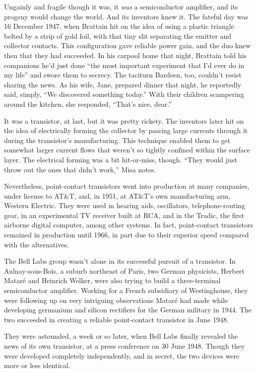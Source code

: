 \documentclass[12pt]{article}
\begin{document}
Ungainly and fragile though it was, it {\it was} a semiconductor amplifier, and its progeny would change the world. And its inventors knew it. The fateful day was 16 December 1947, when Brattain hit on the idea of using a plastic triangle belted by a strip of gold foil, with that tiny slit separating the emitter and collector contacts. This configuration gave reliable power gain, and the duo knew then that they had succeeded. In his carpool home that night, Brattain told his companions he’d just done ``the most important experiment that I’d ever do in my life'' and swore them to secrecy. The taciturn Bardeen, too, couldn’t resist sharing the news. As his wife, Jane, prepared dinner that night, he reportedly said, simply, ``We discovered something today.'' With their children scampering around the kitchen, she responded, ``That’s nice, dear.''

It was a transistor, at last, but it was pretty rickety. The inventors later hit on the idea of electrically forming the collector by passing large currents through it during the transistor’s manufacturing. This technique enabled them to get somewhat larger current flows that weren’t so tightly confined within the surface layer. The electrical forming was a bit hit-or-miss, though. ``They would just throw out the ones that didn’t work,'' Misa notes.

Nevertheless, point-contact transistors went into production at many companies, under license to AT\&T, and, in 1951, at AT\&T’s own manufacturing arm, Western Electric. They were used in hearing aids, oscillators, telephone-routing gear, in an experimental TV receiver built at RCA, and in the Tradic, the first airborne digital computer, among other systems. In fact, point-contact transistors remained in production until 1966, in part due to their superior speed compared with the alternatives.

The Bell Labs group wasn’t alone in its successful pursuit of a transistor. In Aulnay-sous-Bois, a suburb northeast of Paris, two German physicists, Herbert Matar\'e and Heinrich Welker, were also trying to build a three-terminal semiconductor amplifier. Working for a French subsidiary of Westinghouse, they were following up on very intriguing observations Matar\'e had made while developing germanium and silicon rectifiers for the German military in 1944. The two succeeded in creating a reliable point-contact transistor in June 1948.

They were astounded, a week or so later, when Bell Labs finally revealed the news of its own transistor, at a press conference on 30 June 1948. Though they were developed completely independently, and in secret, the two devices were more or less identical.
\end{document}
